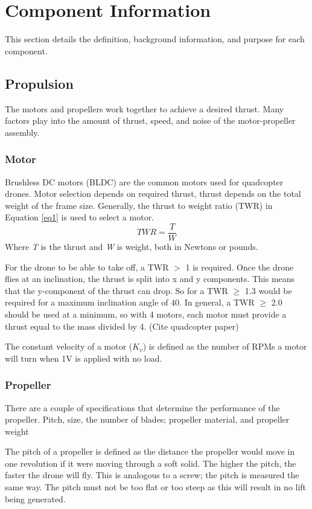 \chapter{Component Information}
This section details the definition, background information, and purpose for each component.
\section{Propulsion}
The motors and propellers work together to achieve a desired thrust. Many factors play into the amount of thrust, speed, and noise of the motor-propeller assembly. 

\subsection{Motor}
Brushless DC motors (BLDC) are the common motors used for quadcopter drones. 
Motor selection depends on required thrust, thrust depends on the total weight of the frame size. Generally, the thrust to weight ratio (TWR) in Equation \ref{eq1} is used to select a motor.
\begin{equation} \label{eq1}
TWR = \frac{T}{W}
\end{equation}
Where \textit{T} is the thrust and \textit{W} is weight, both in Newtons or pounds.

For the drone to be able to take off, a TWR $>$ 1 is required. Once the drone flies at an inclination, the thrust is split into x and y components. This means that the y-component of the thrust can drop. So for a TWR $ \geq $ 1.3 would be required for a maximum inclination angle of 40. In general, a TWR $ \geq $ 2.0 should be used at a minimum, so with 4 motors, each motor must provide a thrust equal to the mass divided by 4. (Cite quadcopter paper)

The constant velocity of a motor ($K_v$) is defined as the number of RPMs a motor will turn when 1V is applied with no load. 

\subsection{Propeller}
There are a couple of specifications that determine the performance of the propeller. Pitch, size, the number of blades; propeller material, and propeller weight \cite{droneomega}

The pitch of a propeller is defined as the distance the propeller would move in one revolution if it were moving through a soft solid. The higher the pitch, the faster the drone will fly. This is analogous to a screw; the pitch is measured the same way. The pitch must not be too flat or too steep as this will result in no lift being generated. 


